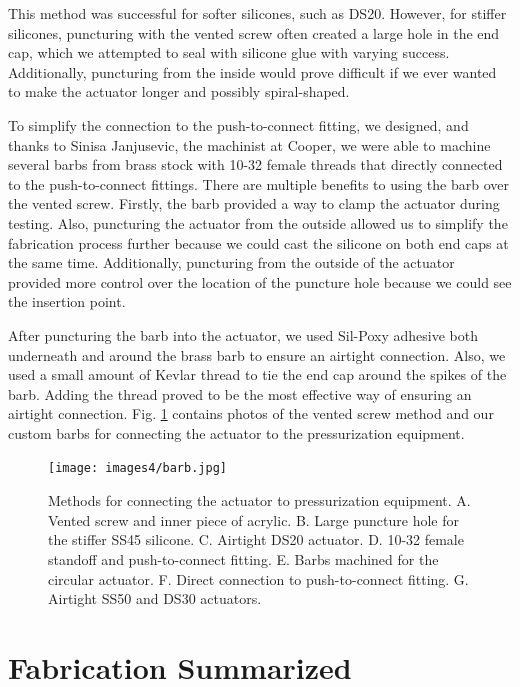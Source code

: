 This method was successful for softer silicones, such as DS20. However, for stiffer silicones, puncturing with the vented screw often created a large hole in the end cap, which we attempted to seal with silicone glue with varying success. Additionally, puncturing from the inside would prove difficult if we ever wanted to make the actuator longer and possibly spiral-shaped. 

To simplify the connection to the push-to-connect fitting, we designed, and thanks to Sinisa Janjusevic, the machinist at Cooper, we were able to machine several barbs from brass stock with 10-32 female threads that directly connected to the push-to-connect fittings. There are multiple benefits to using the barb over the vented screw. Firstly, the barb provided a way to clamp the actuator during testing. Also, puncturing the actuator from the outside allowed us to simplify the fabrication process further because we could cast the silicone on both end caps at the same time. Additionally, puncturing from the outside of the actuator provided more control over the location of the puncture hole because we could see the insertion point. 

After puncturing the barb into the actuator, we used Sil-Poxy adhesive both underneath and around the brass barb to ensure an airtight connection. Also, we used a small amount of Kevlar thread to tie the end cap around the spikes of the barb. Adding the thread proved to be the most effective way of ensuring an airtight connection. Fig. \ref{fig:barb} contains photos of the vented screw method and our custom barbs for connecting the actuator to the pressurization equipment. 

\begin{figure}[h!]
    \centering
    \texttt{[image: images4/barb.jpg]}
    \caption{Methods for connecting the actuator to pressurization equipment. A. Vented screw and inner piece of acrylic. B. Large puncture hole for the stiffer SS45 silicone. C. Airtight DS20 actuator. D. 10-32 female standoff and push-to-connect fitting. E. Barbs machined for the circular actuator. F. Direct connection to push-to-connect fitting. G. Airtight SS50 and DS30 actuators. }
    \label{fig:barb}
\end{figure}

\clearpage
\section{Fabrication Summarized}

